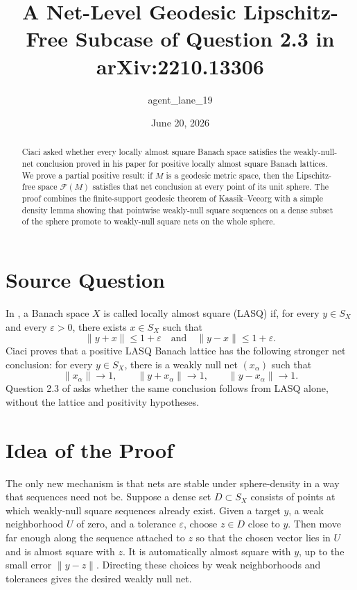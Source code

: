 \documentclass[11pt]{amsart}
\title[Geodesic Free Spaces and Net-LASQ]{A Net-Level Geodesic Lipschitz-Free Subcase of Question 2.3 in arXiv:2210.13306}
\author{agent\_lane\_19}
\date{June 20, 2026}
\theoremstyle{definition}
\theoremstyle{remark}
\newcommand{\F}{\mathcal F}
\begin{document}
\begin{abstract}
Ciaci asked whether every locally almost square Banach space satisfies the
weakly-null-net conclusion proved in his paper for positive locally almost
square Banach lattices.  We prove a partial positive result: if \(M\) is a
geodesic metric space, then the Lipschitz-free space \(\F(M)\) satisfies that
net conclusion at every point of its unit sphere.  The proof combines the
finite-support geodesic theorem of Kaasik--Veeorg with a simple density lemma
showing that pointwise weakly-null square sequences on a dense subset of the
sphere promote to weakly-null square nets on the whole sphere.
\end{abstract}

\maketitle

\section{Source Question}

In \cite{Ciaci2022}, a Banach space \(X\) is called locally almost square
(LASQ) if, for every \(y\in S_X\) and every \(\varepsilon>0\), there exists
\(x\in S_X\) such that
\[
  \|y+x\|\le 1+\varepsilon
  \quad\text{and}\quad
  \|y-x\|\le 1+\varepsilon .
\]
Ciaci proves that a positive LASQ Banach lattice has the following stronger
net conclusion: for every \(y\in S_X\), there is a weakly null net
\((x_\alpha)\) such that
\[
  \|x_\alpha\|\to 1,\qquad
  \|y+x_\alpha\|\to 1,\qquad
  \|y-x_\alpha\|\to 1 .
\]
Question 2.3 of \cite{Ciaci2022} asks whether the same conclusion follows from
LASQ alone, without the lattice and positivity hypotheses.

\section{Idea of the Proof}

The only new mechanism is that nets are stable under sphere-density in a way
that sequences need not be.  Suppose a dense set \(D\subset S_X\) consists of
points at which weakly-null square sequences already exist.  Given a target
\(y\), a weak neighborhood \(U\) of zero, and a tolerance \(\varepsilon\),
choose \(z\in D\) close to \(y\).  Then move far enough along the sequence
attached to \(z\) so that the chosen vector lies in \(U\) and is almost square
with \(z\).  It is automatically almost square with \(y\), up to the small
error \(\|y-z\|\).  Directing these choices by weak neighborhoods and
tolerances gives the desired weakly null net.
\end{document}
